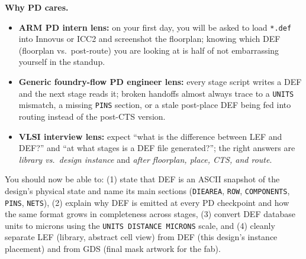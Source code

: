 \begin{pdnote}
\textbf{Why PD cares.}
\begin{itemize}
  \item \textbf{ARM PD intern lens:} on your first day, you will be asked to load \texttt{*.def} into Innovus or ICC2 and screenshot the floorplan; knowing which DEF (floorplan vs.\ post-route) you are looking at is half of not embarrassing yourself in the standup.
  \item \textbf{Generic foundry-flow PD engineer lens:} every stage script writes a DEF and the next stage reads it; broken handoffs almost always trace to a \texttt{UNITS} mismatch, a missing \texttt{PINS} section, or a stale post-place DEF being fed into routing instead of the post-CTS version.
  \item \textbf{VLSI interview lens:} expect ``what is the difference between LEF and DEF?'' and ``at what stages is a DEF file generated?''; the right answers are \emph{library vs.\ design instance} and \emph{after floorplan, place, CTS, and route}.
\end{itemize}
\end{pdnote}

\begin{checkpoint}
You should now be able to: (1) state that DEF is an ASCII snapshot of the design's physical state and name its main sections (\texttt{DIEAREA}, \texttt{ROW}, \texttt{COMPONENTS}, \texttt{PINS}, \texttt{NETS}), (2) explain why DEF is emitted at every PD checkpoint and how the same format grows in completeness across stages, (3) convert DEF database units to microns using the \texttt{UNITS DISTANCE MICRONS} scale, and (4) cleanly separate LEF (library, abstract cell view) from DEF (this design's instance placement) and from GDS (final mask artwork for the fab).

\end{checkpoint}
